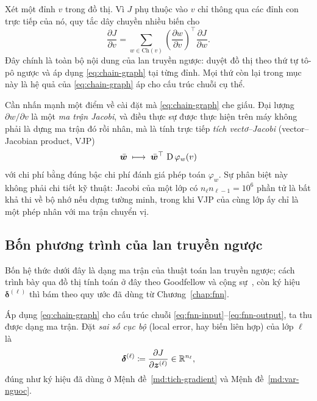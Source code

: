 Xét một đỉnh $v$ trong đồ thị. Vì $J$ phụ thuộc vào $v$ chỉ thông qua các đỉnh
con trực tiếp của nó, quy tắc dây chuyền nhiều biến cho
\begin{equation}
\frac{\partial J}{\partial v}
= \sum_{w \in \mathrm{Ch}(v)}
\left( \frac{\partial w}{\partial v} \right)^{\!\top}
\frac{\partial J}{\partial w}.
\label{eq:chain-graph}
\end{equation}
Đây chính là toàn bộ nội dung của lan truyền ngược: duyệt đồ thị theo thứ tự
tô-pô ngược và áp dụng \eqref{eq:chain-graph} tại từng đỉnh. Mọi thứ còn lại
trong mục này là hệ quả của \eqref{eq:chain-graph} áp cho cấu trúc chuỗi cụ thể.
 
Cần nhấn mạnh một điểm về cài đặt mà \eqref{eq:chain-graph} che giấu. Đại lượng
$\partial w/\partial v$ là một \emph{ma trận Jacobi}, và điều thực sự được thực
hiện trên máy không phải là dựng ma trận đó rồi nhân, mà là tính trực tiếp
\emph{tích vectơ--Jacobi} (vector--Jacobian product, VJP)
\begin{equation}
\bar{\bm{w}} \;\longmapsto\; \bar{\bm{w}}^{\top}\, \operatorname{D}\varphi_w(v)
\label{eq:vjp}
\end{equation}
với chi phí bằng đúng bậc chi phí đánh giá phép toán $\varphi_w$. Sự phân biệt
này không phải chi tiết kỹ thuật: Jacobi của một lớp có $n_\ell n_{\ell-1} =
10^6$ phần tử là bất khả thi về bộ nhớ nếu dựng tường minh, trong khi VJP của
cùng lớp ấy chỉ là một phép nhân với ma trận chuyển vị.
 
\subsection{Bốn phương trình của lan truyền ngược}
\label{subsec:bon-pt}

Bốn hệ thức dưới đây là dạng ma trận của thuật toán lan truyền ngược; cách trình
bày qua đồ thị tính toán ở đây theo Goodfellow và cộng sự~\cite{goodfellow2016},
còn ký hiệu $\bm{\delta}^{(\ell)}$ thì bám theo quy ước đã dùng từ
Chương~\ref{chap:fnn}.

Áp dụng \eqref{eq:chain-graph} cho cấu trúc chuỗi
\eqref{eq:fnn-input}--\eqref{eq:fnn-output}, ta thu được dạng ma trận. Đặt
\emph{sai số cục bộ} (local error, hay biến liên hợp) của lớp $\ell$ là
\begin{equation}
\bm{\delta}^{(\ell)} \coloneqq \frac{\partial J}{\partial \bm{z}^{(\ell)}}
\in \mathbb{R}^{n_\ell},
\label{eq:delta-def}
\end{equation}
đúng như ký hiệu đã dùng ở Mệnh đề~\ref{md:tich-gradient} và
Mệnh đề~\ref{md:var-nguoc}.
 
